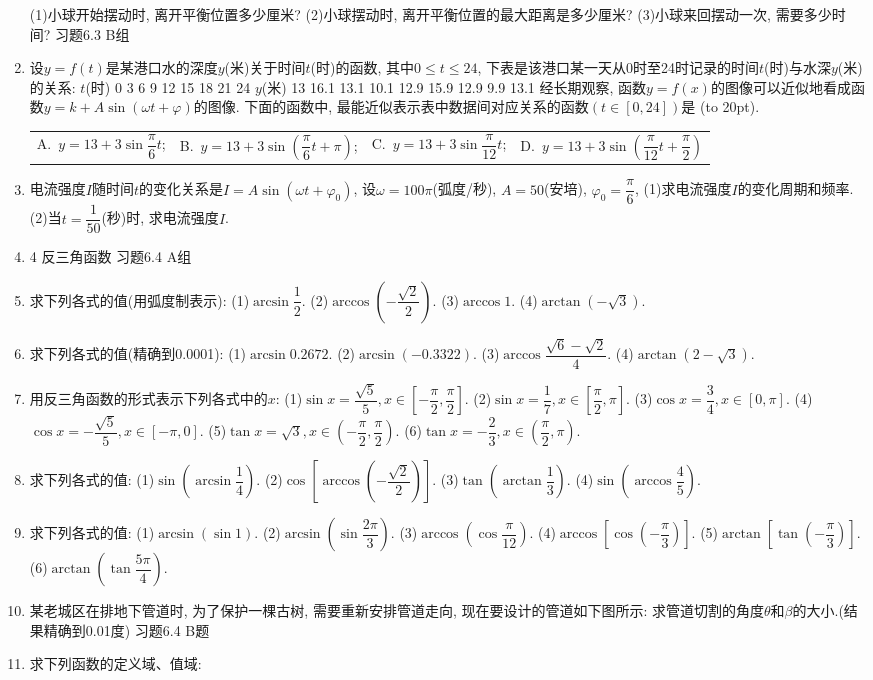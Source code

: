 \documentclass[10pt,a4paper]{article}
\newcommand{\bracket}[1]{(\hbox to #1pt{})}
\newcommand{\fourch}[4]{\par\begin{tabular}{p{.23\textwidth}p{.23\textwidth}p{.23\textwidth}p{.23\textwidth}}
A.~#1 &B.~#2& C.~#3& D.~#4
\end{tabular}}
\begin{document}
\begin{enumerate}[1.]
(1)小球开始摆动时, 离开平衡位置多少厘米?
(2)小球摆动时, 离开平衡位置的最大距离是多少厘米?
(3)小球来回摆动一次, 需要多少时间?
习题6.3  B组
\item 设$y=f(t)$是某港口水的深度$y$(米)关于时间$t$(时)的函数, 其中$0\le t\le 24$, 下表是该港口某一天从0时至24时记录的时间$t$(时)与水深$y$(米)的关系:
$t$(时)	0	3	6	9	12	15	18	21	24
$y$(米)	13	16.1	13.1	10.1	12.9	15.9	12.9	9.9	13.1
经长期观察, 函数$y=f(x)$的图像可以近似地看成函数$y=k+A\sin (\omega t+\varphi)$的图像.
下面的函数中, 最能近似表示表中数据间对应关系的函数$(t\in [0,24])$是		\bracket{20}.
\fourch{$y=13+3\sin \dfrac{\pi }6t$;}{$y=13+3\sin (\dfrac{\pi }6t+\pi)$;}{$y=13+3\sin \dfrac{\pi }{12}t$;}{$y=13+3\sin (\dfrac{\pi }{12}t+\dfrac{\pi }2)$}
\item 电流强度$I$随时间$t$的变化关系是$I=A\sin (\omega t+\varphi _0)$, 设$\omega =100\pi$(弧度/秒), $A=50$(安培), $\varphi _0=\dfrac{\pi }6$,
(1)求电流强度$I$的变化周期和频率.
(2)当$t=\dfrac 1{50}$(秒)时, 求电流强度$I$.
\item 4  反三角函数
习题6.4  A组
\item 求下列各式的值(用弧度制表示):
(1)$\arcsin \dfrac 12$.								(2)$\arccos (-\dfrac{\sqrt 2}2)$.
(3)$\arccos 1$.								(4)$\arctan (-\sqrt 3)$.
\item 求下列各式的值(精确到0.0001):
(1)$\arcsin 0.2672$.							(2)$\arcsin (-0.3322)$.
(3)$\arccos \dfrac{\sqrt 6-\sqrt 2}4$.						(4)$\arctan (2-\sqrt 3)$.
\item 用反三角函数的形式表示下列各式中的$x$:
(1)$\sin x=\dfrac{\sqrt 5}5,x\in [-\dfrac{\pi }2,\dfrac{\pi }2]$.				(2)$\sin x=\dfrac 17,x\in [\dfrac{\pi }2,\pi]$.
(3)$\cos x=\dfrac 34,x\in [0,\pi]$.					(4)$\cos x=-\dfrac{\sqrt 5}5,x\in [-\pi ,0]$.
(5)$\tan x=\sqrt 3,x\in (-\dfrac{\pi }2,\dfrac{\pi }2)$.				(6)$\tan x=-\dfrac 23,x\in (\dfrac{\pi }2,\pi)$.
\item 求下列各式的值:
(1)$\sin (\arcsin \dfrac 14)$.							(2)$\cos [\arccos (-\dfrac{\sqrt 2}2)]$.
(3)$\tan (\arctan \dfrac 13)$.							(4)$\sin (\arccos \dfrac 45)$.
\item 求下列各式的值:
(1)$\arcsin (\sin 1)$.							(2)$\arcsin (\sin \dfrac{2\pi }3)$.
(3)$\arccos (\cos \dfrac{\pi }{12})$.						(4)$\arccos [\cos (-\dfrac{\pi }3)]$.
(5)$\arctan [\tan (-\dfrac{\pi }3)]$.						(6)$\arctan (\tan \dfrac{5\pi }4)$.
\item 某老城区在排地下管道时, 为了保护一棵古树, 需要重新安排管道走向, 现在要设计的管道如下图所示: 求管道切割的角度$\theta$和$\beta$的大小.(结果精确到0.01度)
习题6.4  B题
\item 求下列函数的定义域、值域:

\end{enumerate}
\end{document}
